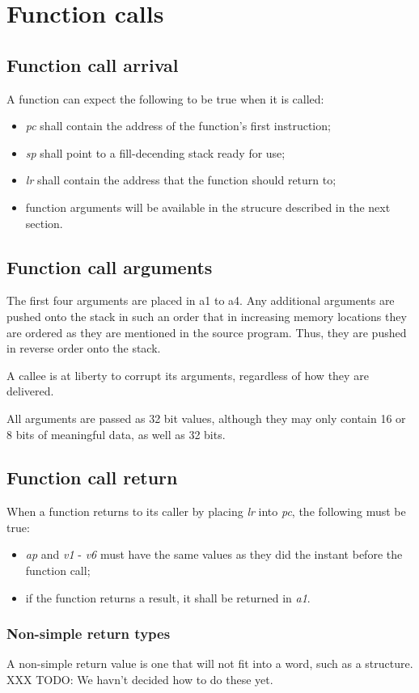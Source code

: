 \documentclass[a4paper,twoside,openany]{book}
\begin{document}
    \section{Function calls}
      \subsection{Function call arrival}
        A function can expect the following to be true when it is called:
        \begin{itemize}
          \item \emph{pc} shall contain the address of the function's
            first instruction;
          \item \emph{sp} shall point to a fill-decending stack ready for use;
          \item \emph{lr} shall contain the address that the function should
            return to;
          \item function arguments will be available in the strucure described
            in the next section.
        \end{itemize}

      \subsection{Function call arguments}
        The first four arguments are placed in a1 to a4.  Any additional
        arguments are pushed onto the stack in such an order that in increasing
        memory locations they are ordered as they are mentioned in the source
        program.  Thus, they are pushed in reverse order onto the stack.

        A callee is at liberty to corrupt its arguments, regardless of how they
        are delivered.

        All arguments are passed as 32 bit values, although they may only
        contain 16 or 8 bits of meaningful data, as well as 32 bits.
        
      \subsection{Function call return}
          When a function returns to its caller by placing \emph{lr} into
          \emph{pc}, the following must be true:
          \begin{itemize}
            \item \emph{ap} and \emph{v1} - \emph{v6} must have the same values
              as they did the instant before the function call;

            \item if the function returns a result, it shall be returned in
              \emph{a1}.
          \end{itemize}

        \subsubsection{Non-simple return types}
          A non-simple return value is one that will not fit into a word, such
          as a structure.  XXX TODO: We havn't decided how to do these yet.
\end{document}
